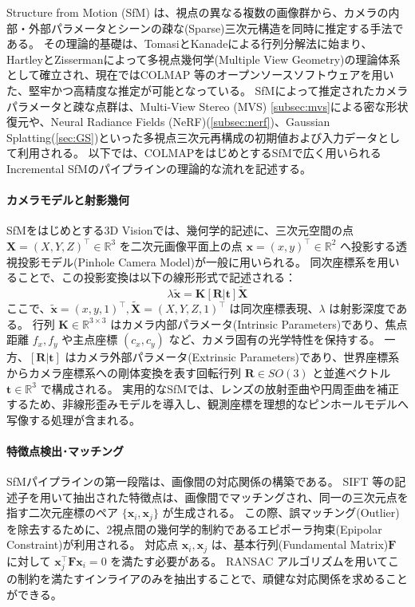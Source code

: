 Structure from Motion (SfM) は、視点の異なる複数の画像群から、カメラの内部・外部パラメータとシーンの疎な(Sparse)三次元構造を同時に推定する手法である。
その理論的基礎は、TomasiとKanadeによる行列分解法\cite{Tomasi1992_FactorizationMethod}に始まり、HartleyとZissermanによって多視点幾何学(Multiple View Geometry)の理論体系\cite{Hartley2004_MultipleViewGeometry}として確立され、現在ではCOLMAP \cite{schoenberger2016_colmap}等のオープンソースソフトウェアを用いた、堅牢かつ高精度な推定が可能となっている。
SfMによって推定されたカメラパラメータと疎な点群は、Multi-View Stereo (MVS) \cref{subsec:mvs}による密な形状復元や、Neural Radiance Fields (NeRF)(\cref{subsec:nerf})、Gaussian Splatting(\cref{sec:GS})といった多視点三次元再構成の初期値および入力データとして利用される。
以下では、COLMAPをはじめとするSfMで広く用いられるIncremental SfMのパイプラインの理論的な流れを記述する。

\paragraph{カメラモデルと射影幾何}
SfMをはじめとする3D Visionでは、幾何学的記述に、三次元空間の点 $\bm{X} = (X, Y, Z)^\top \in \mathbb{R}^3$ を二次元画像平面上の点 $\bm{x} = (x, y)^\top \in \mathbb{R}^2$ へ投影する透視投影モデル(Pinhole Camera Model)が一般に用いられる。
同次座標系を用いることで、この投影変換は以下の線形形式で記述される：
\begin{equation}\label{eq:sfm-projection}
  \lambda \tilde{\bm{x}} = \bm{K} [\bm{R} | \bm{t}] \tilde{\bm{X}}
\end{equation}
ここで、$\tilde{\bm{x}} = (x, y, 1)^\top, \tilde{\bm{X}} = (X, Y, Z, 1)^\top$ は同次座標表現、$\lambda$ は射影深度である。
行列 $\bm{K} \in \mathbb{R}^{3 \times 3}$ はカメラ内部パラメータ(Intrinsic Parameters)であり、焦点距離 $f_x, f_y$ や主点座標 $(c_x, c_y)$ など、カメラ固有の光学特性を保持する。
一方、$[\bm{R} | \bm{t}]$ はカメラ外部パラメータ(Extrinsic Parameters)であり、世界座標系からカメラ座標系への剛体変換を表す回転行列 $\bm{R} \in SO(3)$ と並進ベクトル $\bm{t} \in \mathbb{R}^3$ で構成される。
実用的なSfMでは、レンズの放射歪曲や円周歪曲を補正するため、非線形歪みモデルを導入し、観測座標を理想的なピンホールモデルへ写像する処理が含まれる。

\paragraph{特徴点検出･マッチング}
SfMパイプラインの第一段階は、画像間の対応関係の構築である。
SIFT \cite{Lowe2004_SIFT} 等の記述子を用いて抽出された特徴点は、画像間でマッチングされ、同一の三次元点を指す二次元座標のペア $\{\bm{x}_i, \bm{x}_j\}$ が生成される。
この際、誤マッチング(Outlier)を除去するために、2視点間の幾何学的制約であるエピポーラ拘束(Epipolar Constraint)が利用される。
対応点 $\bm{x}_i, \bm{x}_j$ は、基本行列(Fundamental Matrix)$\bm{F}$ に対して $\bm{x}_j^\top \bm{F} \bm{x}_i = 0$ を満たす必要がある。
RANSAC \cite{Fischler1987_RANSAC} アルゴリズムを用いてこの制約を満たすインライアのみを抽出することで、頑健な対応関係を求めることができる。

